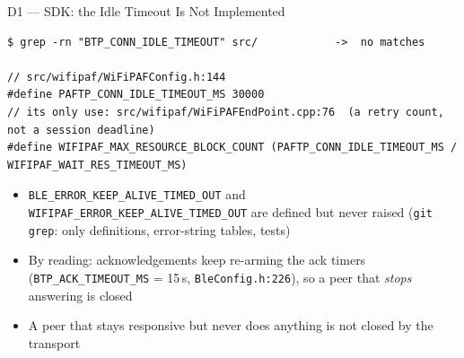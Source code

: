\documentclass[10pt,aspectratio=169,t]{beamer}
\begin{document}
\begin{frame}[fragile]{D1 --- SDK: the Idle Timeout Is Not Implemented}
\begin{lstlisting}[style=cppsmall]
$ grep -rn "BTP_CONN_IDLE_TIMEOUT" src/            ->  no matches

// src/wifipaf/WiFiPAFConfig.h:144
#define PAFTP_CONN_IDLE_TIMEOUT_MS 30000
// its only use: src/wifipaf/WiFiPAFEndPoint.cpp:76  (a retry count, not a session deadline)
#define WIFIPAF_MAX_RESOURCE_BLOCK_COUNT (PAFTP_CONN_IDLE_TIMEOUT_MS / WIFIPAF_WAIT_RES_TIMEOUT_MS)
\end{lstlisting}
\begin{itemize}\small
  \item \texttt{BLE\_ERROR\_KEEP\_ALIVE\_TIMED\_OUT} and
        \texttt{WIFIPAF\_ERROR\_KEEP\_ALIVE\_TIMED\_OUT} are defined but never
        raised (\texttt{git grep}: only definitions, error-string tables, tests)
  \item By reading: acknowledgements keep re-arming the ack timers
        (\texttt{BTP\_ACK\_TIMEOUT\_MS} = 15\,s, \texttt{BleConfig.h:226}), so a peer
        that \emph{stops} answering is closed
  \item A peer that stays responsive but never does anything is not closed by
        the transport
\end{itemize}
\end{frame}
\end{document}
